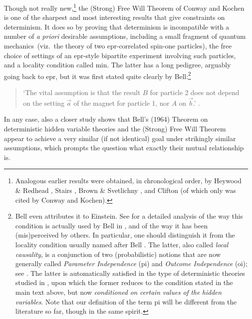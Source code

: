 \documentclass[12pt]{article}
\newcommand{\epr}{{\sc epr}}
\newcommand{\qm}{quantum mechanics}
\begin{document}
Though not really new,\footnote{Analogous earlier results were obtained, in chronological order, by Heywood \& Redhead \cite{HR}, Stairs \cite{Stairs}, Brown \& Svetlichny \cite{BS}, and Clifton \cite{Clifton} (of which only \cite{HR} was cited by Conway and Kochen).}  the (Strong) Free Will Theorem of Conway and Kochen  \cite{CK1,CK2} is one of the sharpest and most interesting results that give constraints on determinism. It does so by  proving that determinism is incompatible with a number of \emph{a priori} desirable assumptions, including a small fragment of \qm\ (viz.\ the theory of two \epr-correlated spin-one particles), the free choice of settings of an \epr-style bipartite experiment involving such particles, and a  locality 
condition called {\sc min}. The latter has a long pedigree, arguably going back to {\sc epr}, but it was first stated quite clearly by Bell:\footnote{Bell \cite{Bell1} even attributes it to Einstein.
See \cite{Wiseman} for a detailed  analysis of the way this condition is actually used by Bell in \cite{Bell1,Bell3},
and of the way it has been (mis)perceived by others. In particular, one should distinguish it
from the locality condition usually named after Bell \cite{Bell4}. The latter, also called \emph{local causality},  is a conjunction of  two (probabilistic) notions  that are now generally called \emph{Parameter Independence}  ({\sc pi})
and \emph{Outcome Independence} ({\sc oi}); see  \cite{Bub,Jaeger,Jarrett,Maudlin,Seevinck,Shimony}.
The latter is automatically satisfied in the type of  deterministic  theories studied in \cite{Bell1,CK1,CK2}, upon which the former reduces to the condition  stated in the main text above, but now \emph{conditioned on certain values of the hidden variables}. Note that our  definition of the term {\sc pi} will  be different from the literature so far, though in the same spirit.} 
\begin{quotation}
`The vital assumption is that the result $B$ for particle 2 does not depend on the setting $\vec{a}$ of the magnet for particle 1, nor $A$ on $\vec{b}$.' \cite[p.\ 196]{Bell1}.
\end{quotation} 
In any case, also a closer study shows that Bell's (1964) Theorem on deterministic hidden variable theories  and the (Strong) Free Will Theorem appear to achieve a very similar (if not identical)  goal under strikingly similar assumptions, which prompts the question what exactly their mutual relationship is. 
\end{document}
